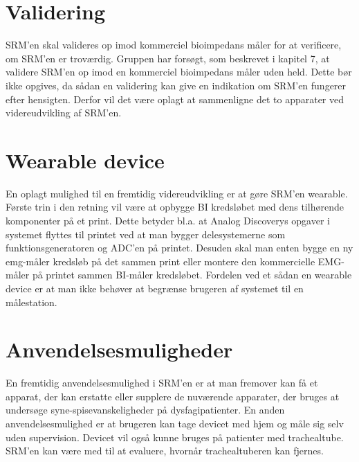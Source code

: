 
\section{Validering}

SRM'en skal valideres op imod kommerciel bioimpedans måler for at verificere, om SRM'en er troværdig. Gruppen har forsøgt, som beskrevet i kapitel 7, at validere SRM'en op imod en kommerciel bioimpedans måler uden held. Dette bør ikke opgives, da sådan en validering kan give en indikation om SRM'en fungerer efter hensigten. Derfor vil det være oplagt at sammenligne det to apparater ved videreudvikling af SRM'en. 

\section{Wearable device}
En oplagt mulighed til en fremtidig videreudvikling er at gøre SRM'en wearable. Første trin i den retning vil være at opbygge BI kredsløbet med dens tilhørende komponenter på et print. Dette betyder bl.a. at Analog Discoverys opgaver i systemet flyttes til printet ved at man bygger delesystemerne som funktionsgeneratoren og ADC'en på printet. Desuden skal man enten bygge en ny emg-måler kredsløb på det sammen print eller montere den kommercielle EMG-måler på printet sammen BI-måler kredsløbet. Fordelen ved et sådan en wearable device er at man ikke behøver at begrænse brugeren af systemet til en målestation.   


\section{Anvendelsesmuligheder}
En fremtidig anvendelsesmulighed i SRM'en er at man fremover kan få et apparat, der kan erstatte eller supplere de nuværende apparater, der bruges at undersøge syne-spisevanskeligheder på dysfagipatienter. En anden anvendelsesmulighed er at brugeren kan tage devicet med hjem og måle sig selv uden supervision. Devicet vil også kunne bruges på  patienter med trachealtube. SRM'en kan være med til at evaluere, hvornår trachealtuberen kan fjernes.    